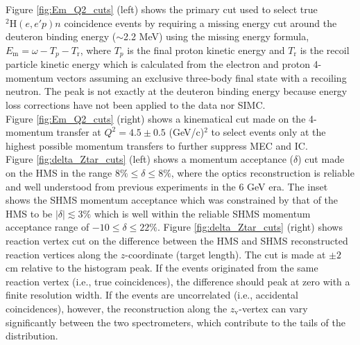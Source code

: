 \documentclass[aps, prl]{revtex4-2}  %
\begin{document}
\indent Figure \ref{fig:Em_Q2_cuts} (left) shows the primary cut used to select true $^{2}\mathrm{H}(e,e'p)n$ coincidence events by requiring a missing
energy cut around the deuteron binding energy ($\sim$2.2 MeV) using the missing energy formula, $E_{\mathrm{m}} = \omega - T_{p} - T_{\mathrm{r}}$, where
$T_{p}$ is the final proton kinetic energy and $T_{\mathrm{r}}$ is the recoil particle kinetic energy which is calculated from the electron and proton
4-momentum vectors assuming an exclusive three-body final state with a recoiling neutron. The peak is not exactly at the deuteron binding energy because
energy loss corrections have not been applied to the data nor SIMC. \\
\indent Figure \ref{fig:Em_Q2_cuts} (right) shows a
kinematical cut made on the 4-momentum transfer at $Q^{2} = 4.5\pm0.5$ (GeV/c)$^{2}$
to select events only at the highest possible momentum transfers to further suppress MEC and IC. \\
\indent Figure \ref{fig:delta_Ztar_cuts} (left) shows a momentum acceptance ($\delta$) cut made on the HMS in the range $8\%\leq\delta\leq8\%$, where the optics reconstruction
is reliable and well understood from previous experiments in the 6 GeV era. The inset shows the SHMS momentum acceptance which was constrained by that of the HMS to be
$|\delta|\lesssim$3$\%$ which is well within the reliable SHMS momentum acceptance range of $-10 \leq \delta \leq22 \%$. Figure \ref{fig:delta_Ztar_cuts} (right) shows reaction vertex cut
on the difference between the HMS and SHMS reconstructed reaction vertices along the $z$-coordinate (target length). The cut is made at $\pm2$ cm relative to the histogram peak.
If the events originated from the same reaction vertex (i.e., true coincidences), the difference should peak at zero with a finite resolution width. If the events are uncorrelated
(i.e., accidental coincidences), however, the reconstruction along the $z_{\mathrm{v}}$-vertex can vary significantly between the two spectrometers, which contribute to the tails of the
distribution.\\
\end{document}
